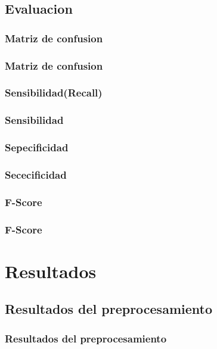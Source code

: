 \documentclass{beamer}
\begin{document}
\subsection{Evaluacion}
\subsubsection{Matriz de confusion}
\begin{frame}
\frametitle{Matriz de confusion}
\end{frame}
\subsubsection{Sensibilidad(Recall)}
\begin{frame}
\frametitle{Sensibilidad}
\end{frame}
\subsubsection{Sepecificidad}
\begin{frame}
\frametitle{Sececificidad}
\end{frame}
\subsubsection{F-Score}
\begin{frame}
\frametitle{F-Score}
\end{frame}



\section{Resultados}


\subsection{Resultados del preprocesamiento}
\begin{frame}
\frametitle{Resultados del preprocesamiento}
\end{frame}
\end{document}
